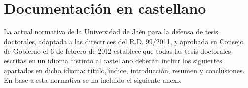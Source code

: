 

\chapter{Documentación en castellano}
\label{sec:spanish_translation}

La actual normativa de la Universidad de Jaén para la defensa de tesis doctorales, adaptada a las directrices del R.D. 99/2011, y aprobada en Consejo de Gobierno el 6 de febrero de 2012 establece que todas las tesis doctorales escritas en un idioma distinto al castellano deberán incluir los siguientes apartados en dicho idioma: título, índice, introducción, resumen y conclusiones. En base a esta normativa se ha incluido el siguiente anexo.